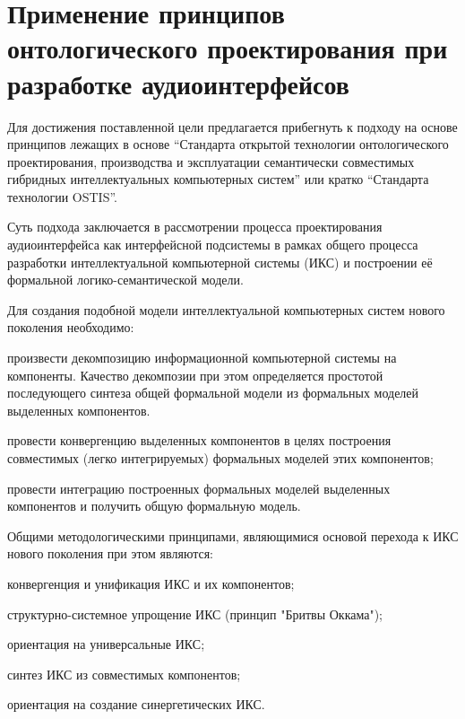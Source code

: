\section{Применение принципов онтологического проектирования при разработке аудиоинтерфейсов}

Для достижения поставленной цели предлагается прибегнуть к подходу на основе принципов лежащих в основе ``Стандарта открытой технологии онтологического проектирования, производства и эксплуатации семантически совместимых гибридных интеллектуальных компьютерных систем'' или кратко ``Стандарта технологии OSTIS''.

Суть подхода заключается в рассмотрении процесса проектирования аудиоинтерфейса как интерфейсной подсистемы в рамках общего процесса разработки интеллектуальной компьютерной системы (ИКС) и построении её формальной логико-семантической модели.

Для создания подобной модели интеллектуальной компьютерных систем нового поколения необходимо:
\begin{textitemize}    
    \item произвести декомпозицию информационной компьютерной системы на компоненты. Качество декомпозии при этом определяется простотой последующего синтеза общей формальной модели из формальных моделей выделенных компонентов.
    \item провести конвергенцию выделенных компонентов в целях построения совместимых (легко интегрируемых) формальных моделей этих компонентов;
    \item провести интеграцию построенных формальных моделей выделенных компонентов и получить общую формальную модель.
\end{textitemize}

Общими методологическими принципами, являющимися основой перехода к ИКС нового поколения при этом являются:
\begin{textitemize}    
    \item конвергенция и унификация ИКС и их компонентов;
    \item структурно-системное упрощение ИКС (принцип "Бритвы Оккама"{});
    \item ориентация на универсальные ИКС;
    \item синтез ИКС из совместимых компонентов;
    \item ориентация на создание синергетических ИКС.
\end{textitemize}

